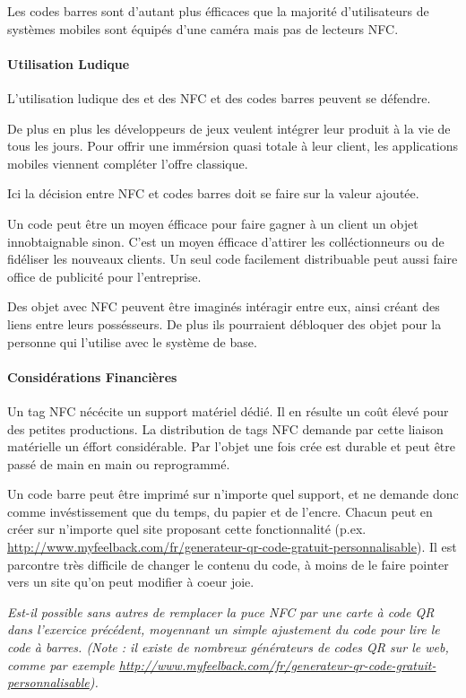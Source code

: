 \documentclass[a4paper,11pt,titlepage]{article}
\begin{document}
Les codes barres sont d'autant plus éfficaces que la majorité d'utilisateurs de systèmes mobiles sont équipés d'une caméra mais pas de lecteurs NFC.

\paragraph{Utilisation Ludique}

L'utilisation ludique des et des NFC et des codes barres peuvent se défendre.

De plus en plus les développeurs de jeux veulent intégrer leur produit à la vie de tous les jours.
Pour offrir une immérsion quasi totale à leur client, les applications mobiles viennent compléter l'offre classique.

Ici la décision entre NFC et codes barres doit se faire sur la valeur ajoutée.

Un code peut être un moyen éfficace pour faire gagner à un client un objet innobtaignable sinon.
C'est un moyen éfficace d'attirer les colléctionneurs ou de fidéliser les nouveaux clients.
Un seul code facilement distribuable peut aussi faire office de publicité pour l'entreprise.

Des objet avec NFC peuvent être imaginés intéragir entre eux, ainsi créant des liens entre leurs possésseurs.
De plus ils pourraient débloquer des objet pour la personne qui l'utilise avec le système de base.

\paragraph{Considérations Financières}

Un tag NFC nécécite un support matériel dédié.
Il en résulte un coût élevé pour des petites productions.
La distribution de tags NFC demande par cette liaison matérielle un éffort considérable.
Par l'objet une fois crée est durable et peut être passé de main en main ou reprogrammé. 

Un code barre peut être imprimé sur n'importe quel support, et ne demande donc comme invéstissement que du temps, du papier et de l'encre.
Chacun peut en créer sur n'importe quel site proposant cette fonctionnalité (p.ex. \url{http://www.myfeelback.com/fr/generateur-qr-code-gratuit-personnalisable}).
Il est parcontre très difficile de changer le contenu du code, à moins de le faire pointer vers un site qu'on peut modifier à coeur joie.

\textit{Est-il possible sans autres de remplacer la puce NFC par une carte à code QR dans l'exercice
précédent, moyennant un simple  ajustement du code pour lire le code à barres. (Note : il existe de
nombreux  générateurs  de codes  QR sur le web, comme par exemple
\url{http://www.myfeelback.com/fr/generateur-qr-code-gratuit-personnalisable}).}
\end{document}

